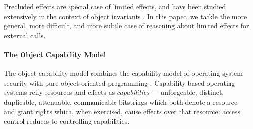  \vspace{.1cm}
 
\noindent
Precluded effects are special case of limited effects,
and have been studied extensively in the context of object invariants   \cite{staticsfull,DrossoFrancaMuellerSummers08,BarDelFahLeiSch04,objInvars,MuellerPoetzsch-HeffterLeavens06}.
In this paper, we tackle the more general, more difficult, and more subtle case of reasoning about limited effects for external calls.
  
 


 
 
\paragraph{The Object Capability Model}


The object-capability model combines the capability model
of operating system security \cite{levy:capabilities,CAP}
with pure object-oriented programming
\cite{selfpower,selfexp95,agha_actors_1987}.  Capability-based
operating systems reify resources and effects 
as \textit{capabilities} ---
unforgeable, distinct, duplicable, attenuable, communicable bitstrings
which both denote a resource and grant rights which, when exercised,
cause effects 
over that resource: access control  reduces to 
controlling capabilities.


